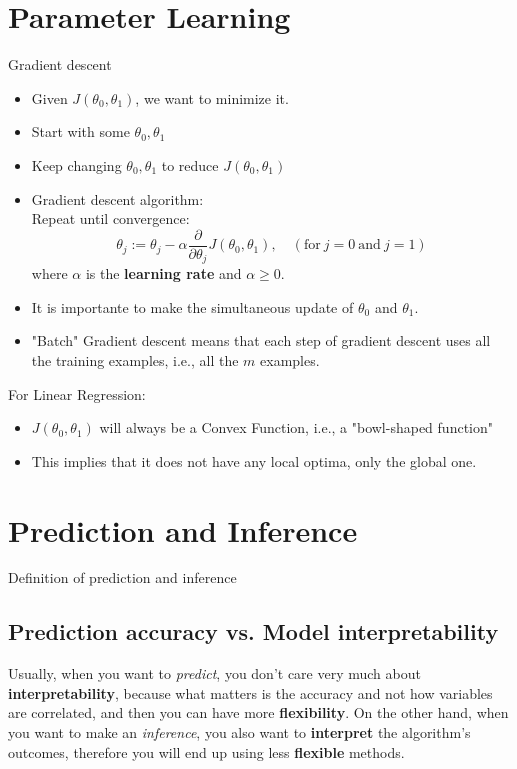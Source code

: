 \documentclass[a4paper,11pt]{article}
\begin{document}
  \section{Parameter Learning}
  Gradient descent
  \begin{itemize}
    \item Given $J(\theta_0, \theta_1)$, we want to minimize it.
    \item Start with some $\theta_0, \theta_1$
    \item Keep changing $\theta_0, \theta_1$ to reduce $J(\theta_0, \theta_1)$
    \item Gradient descent algorithm: \\
    Repeat until convergence:
    \begin{equation}
      \theta_j := \theta_j - \alpha \frac{\partial}{\partial \theta_j}
      J(\theta_0, \theta_1), \quad (\text{for} \ j=0 \ \text{and} \ j=1)
      \label{eq:gradient_descent}
    \end{equation}
    where $\alpha$ is the \textbf{learning rate} and $\alpha \geqslant   0$.
    \item It is importante to make the simultaneous update of $\theta_0$ and $\theta_1$.
    \item "Batch" Gradient descent means that each step of gradient descent uses all the training examples, i.e., all the $m$ examples.
  \end{itemize}
  For Linear Regression:
  \begin{itemize}
    \item $J(\theta_0, \theta_1)$ will always be a Convex Function, i.e., a "bowl-shaped function"
    \item This implies that it does not have any local optima, only the global one.
  \end{itemize}

  \section{Prediction and Inference}

  Definition of prediction and inference

  \subsection*{Prediction accuracy vs. Model interpretability}

  Usually, when you want to \textit{predict}, you don't care very much about \textbf{interpretability}, because what matters is the accuracy and not how variables are correlated, and then you can have more \textbf{flexibility}. On the other hand, when you want to make an \textit{inference}, you also want to \textbf{interpret} the algorithm's outcomes, therefore you will end up using less \textbf{flexible} methods.
\end{document}
